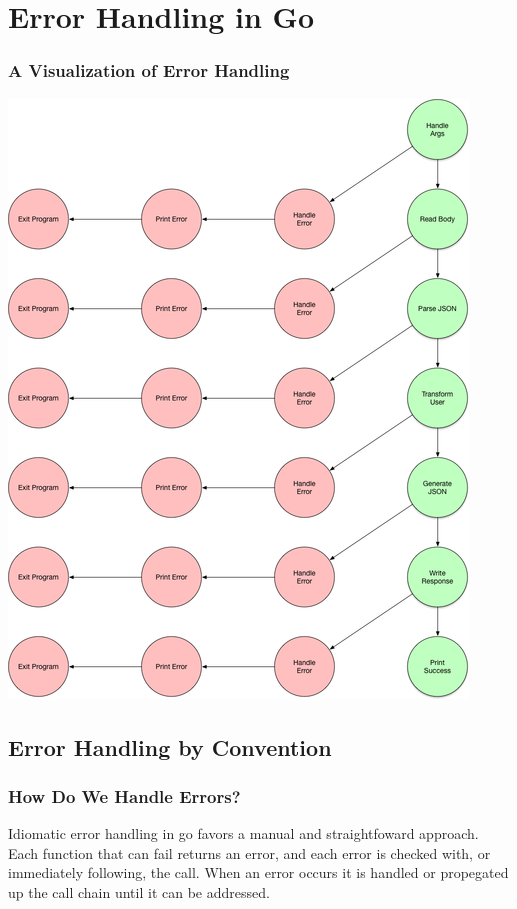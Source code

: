 \documentclass{beamer}
\begin{document}
\section{Error Handling in Go}
\begin{frame}
  \frametitle{A Visualization of Error Handling}
    \begin{center}
    \includegraphics[height=.85\paperheight]{images/small/curr_err_graph}
  \end{center}
\end{frame}

\subsection{Error Handling by Convention}
\begin{frame}
  \frametitle{How Do We Handle Errors?}
  Idiomatic error handling in go favors a manual and straightfoward
  approach. Each function that can fail returns an error, and each
  error is checked with, or immediately following, the call.  When an
  error occurs it is handled or propegated up the call chain until it
  can be addressed.
\end{frame}
\end{document}
